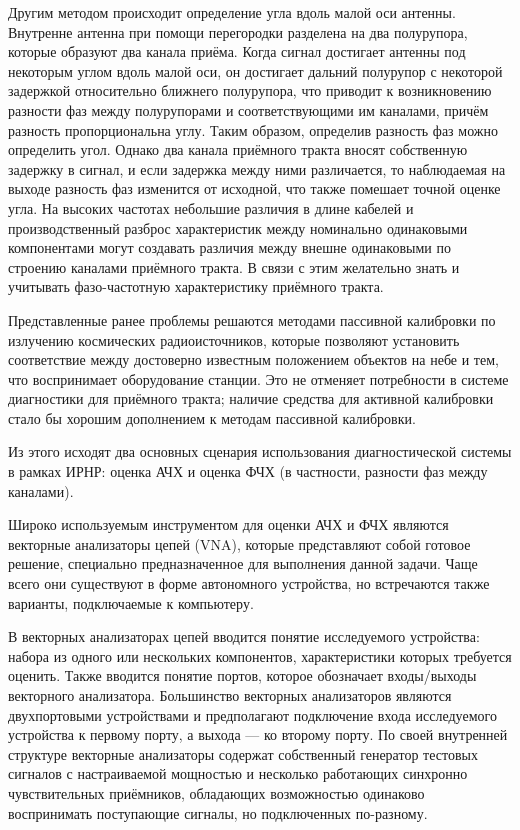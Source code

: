 \documentclass{report}
\begin{document}
Другим методом происходит определение угла вдоль малой оси антенны. Внутренне антенна при помощи перегородки разделена на два полурупора, которые образуют два канала приёма. Когда сигнал достигает антенны под некоторым углом вдоль малой оси, он достигает дальний полурупор с некоторой задержкой относительно ближнего полурупора, что приводит к возникновению разности фаз между полурупорами и соответствующими им каналами, причём разность пропорциональна углу. Таким образом, определив разность фаз можно определить угол. Однако два канала приёмного тракта вносят собственную задержку в сигнал, и если задержка между ними различается, то наблюдаемая на выходе разность фаз изменится от исходной, что также помешает точной оценке угла. На высоких частотах небольшие различия в длине кабелей и производственный разброс характеристик между номинально одинаковыми компонентами могут создавать различия между внешне одинаковыми по строению каналами приёмного тракта. В связи с этим желательно знать и учитывать фазо-частотную характеристику приёмного тракта.

Представленные ранее проблемы решаются методами пассивной калибровки по излучению космических радиоисточников, которые позволяют установить соответствие между достоверно известным положением объектов на небе и тем, что воспринимает оборудование станции. Это не отменяет потребности в системе диагностики для приёмного тракта; наличие средства для активной калибровки стало бы хорошим дополнением к методам пассивной калибровки.

Из этого исходят два основных сценария использования диагностической системы в рамках ИРНР: оценка АЧХ и оценка ФЧХ (в частности, разности фаз между каналами).

Широко используемым инструментом для оценки АЧХ и ФЧХ являются векторные анализаторы цепей (VNA), которые представляют собой готовое решение, специально предназначенное для выполнения данной задачи. Чаще всего они существуют в форме автономного устройства, но встречаются также варианты, подключаемые к компьютеру.

В векторных анализаторах цепей вводится понятие исследуемого устройства: набора из одного или нескольких компонентов, характеристики которых требуется оценить. Также вводится понятие портов, которое обозначает входы/выходы векторного анализатора. Большинство векторных анализаторов являются двухпортовыми устройствами и предполагают подключение входа исследуемого устройства к первому порту, а выхода --- ко второму порту. По своей внутренней структуре векторные анализаторы содержат собственный генератор тестовых сигналов с настраиваемой мощностью и несколько работающих синхронно чувствительных приёмников, обладающих возможностью одинаково воспринимать поступающие сигналы, но подключенных по-разному.
\end{document}
